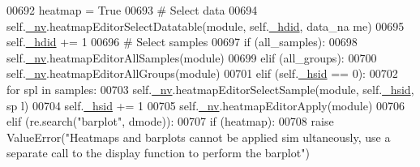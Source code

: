 \begin{DoxyCode}
00692                 heatmap = \textcolor{keyword}{True}
00693                 \textcolor{comment}{# Select data}
00694                 self.\hyperlink{classnavicom_1_1navicom_1_1NaviCom_afff3fd56fa16a68bab52ba8d801e325a}{_nv}.heatmapEditorSelectDatatable(module, self.\hyperlink{classnavicom_1_1navicom_1_1NaviCom_a095a4a928f1f09319fafc949f8580f78}{_hdid}, data\_na
      me)
00695                 self.\hyperlink{classnavicom_1_1navicom_1_1NaviCom_a095a4a928f1f09319fafc949f8580f78}{_hdid} += 1
00696                 \textcolor{comment}{# Select samples}
00697                 \textcolor{keywordflow}{if} (all\_samples):
00698                     self.\hyperlink{classnavicom_1_1navicom_1_1NaviCom_afff3fd56fa16a68bab52ba8d801e325a}{_nv}.heatmapEditorAllSamples(module)
00699                 \textcolor{keywordflow}{elif} (all\_groups):
00700                     self.\hyperlink{classnavicom_1_1navicom_1_1NaviCom_afff3fd56fa16a68bab52ba8d801e325a}{_nv}.heatmapEditorAllGroups(module)
00701                 \textcolor{keywordflow}{elif} (self.\hyperlink{classnavicom_1_1navicom_1_1NaviCom_abf768fde5caf68a79e19385b48ea0bcc}{_hsid} == 0):
00702                     \textcolor{keywordflow}{for} spl \textcolor{keywordflow}{in} samples:
00703                         self.\hyperlink{classnavicom_1_1navicom_1_1NaviCom_afff3fd56fa16a68bab52ba8d801e325a}{_nv}.heatmapEditorSelectSample(module, self.\hyperlink{classnavicom_1_1navicom_1_1NaviCom_abf768fde5caf68a79e19385b48ea0bcc}{_hsid}, sp
      l)
00704                         self.\hyperlink{classnavicom_1_1navicom_1_1NaviCom_abf768fde5caf68a79e19385b48ea0bcc}{_hsid} += 1
00705                     self.\hyperlink{classnavicom_1_1navicom_1_1NaviCom_afff3fd56fa16a68bab52ba8d801e325a}{_nv}.heatmapEditorApply(module)
00706             \textcolor{keywordflow}{elif} (re.search(\textcolor{stringliteral}{"barplot"}, dmode)):
00707                 \textcolor{keywordflow}{if} (heatmap):
00708                     \textcolor{keywordflow}{raise} ValueError(\textcolor{stringliteral}{"Heatmaps and barplots cannot be applied sim
      ultaneously, use a separate call to the display function to perform the barplot"})
      

\end{DoxyCode}
